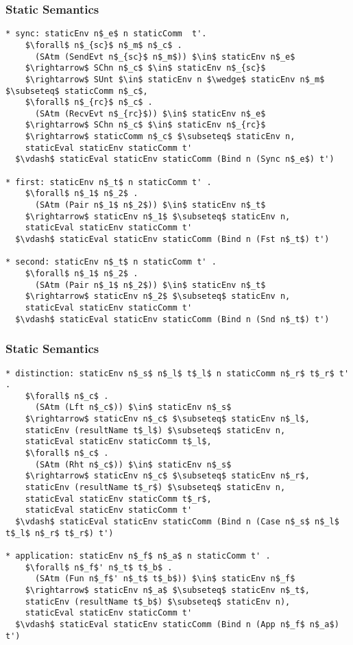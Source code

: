 \documentclass{beamer}
\begin{document}
\begin{frame}[fragile]
	\frametitle{Static Semantics}
\begin{lstlisting}[language=logic, mathescape]
* sync: staticEnv n$_e$ n staticComm  t'.
    $\forall$ n$_{sc}$ n$_m$ n$_c$ . 
      (SAtm (SendEvt n$_{sc}$ n$_m$)) $\in$ staticEnv n$_e$
    $\rightarrow$ SChn n$_c$ $\in$ staticEnv n$_{sc}$ 
    $\rightarrow$ SUnt $\in$ staticEnv n $\wedge$ staticEnv n$_m$ $\subseteq$ staticComm n$_c$,
    $\forall$ n$_{rc}$ n$_c$ . 
      (SAtm (RecvEvt n$_{rc}$)) $\in$ staticEnv n$_e$
    $\rightarrow$ SChn n$_c$ $\in$ staticEnv n$_{rc}$ 
    $\rightarrow$ staticComm n$_c$ $\subseteq$ staticEnv n,
    staticEval staticEnv staticComm t'
  $\vdash$ staticEval staticEnv staticComm (Bind n (Sync n$_e$) t')

* first: staticEnv n$_t$ n staticComm t' . 
    $\forall$ n$_1$ n$_2$ .
      (SAtm (Pair n$_1$ n$_2$)) $\in$ staticEnv n$_t$
    $\rightarrow$ staticEnv n$_1$ $\subseteq$ staticEnv n,
    staticEval staticEnv staticComm t'
  $\vdash$ staticEval staticEnv staticComm (Bind n (Fst n$_t$) t')

* second: staticEnv n$_t$ n staticComm t' . 
    $\forall$ n$_1$ n$_2$ . 
      (SAtm (Pair n$_1$ n$_2$)) $\in$ staticEnv n$_t$
    $\rightarrow$ staticEnv n$_2$ $\subseteq$ staticEnv n,
    staticEval staticEnv staticComm t'
  $\vdash$ staticEval staticEnv staticComm (Bind n (Snd n$_t$) t')

\end{lstlisting}
\end{frame}

\begin{frame}[fragile]
	\frametitle{Static Semantics}
\begin{lstlisting}[language=logic, mathescape]
* distinction: staticEnv n$_s$ n$_l$ t$_l$ n staticComm n$_r$ t$_r$ t' . 
    $\forall$ n$_c$ . 
      (SAtm (Lft n$_c$)) $\in$ staticEnv n$_s$
    $\rightarrow$ staticEnv n$_c$ $\subseteq$ staticEnv n$_l$,
    staticEnv (resultName t$_l$) $\subseteq$ staticEnv n,
    staticEval staticEnv staticComm t$_l$,
    $\forall$ n$_c$ . 
      (SAtm (Rht n$_c$)) $\in$ staticEnv n$_s$
    $\rightarrow$ staticEnv n$_c$ $\subseteq$ staticEnv n$_r$, 
    staticEnv (resultName t$_r$) $\subseteq$ staticEnv n, 
    staticEval staticEnv staticComm t$_r$,
    staticEval staticEnv staticComm t'
  $\vdash$ staticEval staticEnv staticComm (Bind n (Case n$_s$ n$_l$ t$_l$ n$_r$ t$_r$) t')

* application: staticEnv n$_f$ n$_a$ n staticComm t' . 
    $\forall$ n$_f$' n$_t$ t$_b$ . 
      (SAtm (Fun n$_f$' n$_t$ t$_b$)) $\in$ staticEnv n$_f$
    $\rightarrow$ staticEnv n$_a$ $\subseteq$ staticEnv n$_t$, 
    staticEnv (resultName t$_b$) $\subseteq$ staticEnv n),
    staticEval staticEnv staticComm t'
  $\vdash$ staticEval staticEnv staticComm (Bind n (App n$_f$ n$_a$) t')
\end{lstlisting}
\end{frame}
\end{document}
